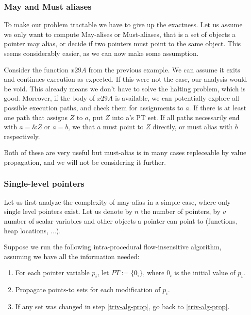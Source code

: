 \subsubsection{May and Must aliases}

To make our problem tractable we have to give up the exactness. Let us assume we
only want to compute May-alises or Must-aliases, that is a set of objects a
pointer may alias, or decide if two pointers must point to the same object. This
seems considerably easier, as we can now make some assumption. 

Consider the function $x29A$ from the previous example. We can assume it exits
and continues execution as expected. If this were not the case, our analysis
would be void.  This already means we don't have to solve the halting problem,
which is good.  Moreover, if the body of $x29A$ is available, we can potentially
explore all possible execution paths, and check them for assignments to $a$. If
there is at least one path that assigns $Z$ to $a$, put $Z$ into a's PT set. If
all paths necessarily end with $a = \&Z$ or $a = b$, we that $a$ must point to
$Z$ directly, or must alias with $b$ respectively.

Both of these are very useful but must-alias is in many cases repleceable by
value propagation, and we will not be considering it further.

\subsubsection{Single-level pointers}

Let us first analyze the complexity of may-alias in a simple case, where only
single level pointers exist. Let us denote by $n$ the number of pointers, by $v$
number of scalar variables and other objects a pointer can point to (functions,
heap locations, ...).

Suppose we run the following intra-procedural flow-insensitive algorithm,
assuming we have all the information needed:

\begin{enumerate}
	\item For each pointer variable $p_i$, let $PT := \{ 0_i \}$, where $0_i$ is
		the initial value of $p_i$.
	\item Propagate points-to sets for each modification of $p_i$.
\label{triv-alg-prop}
	\item If any set was changed in step \ref{triv-alg-prop}, go back to
		\ref{triv-alg-prop}.
\end{enumerate}

